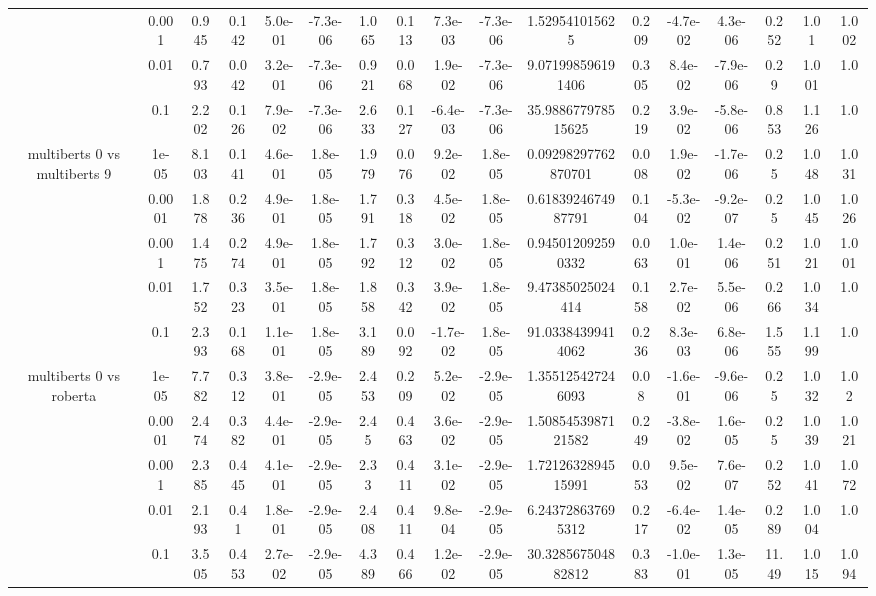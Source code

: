 \begin{tabular}{|c|c|c|c|c|c|c|c|c|c|c|c|c|c|c|c|c|}
 & 0.001 & 0.945 & 0.142 & 5.0e-01 & -7.3e-06 & 1.065 & 0.113 & 7.3e-03 & -7.3e-06 & 1.529541015625 & 0.209 & -4.7e-02 & 4.3e-06 & 0.252 & 1.01 & 1.002 \\
 & 0.01 & 0.793 & 0.042 & 3.2e-01 & -7.3e-06 & 0.921 & 0.068 & 1.9e-02 & -7.3e-06 & 9.071998596191406 & 0.305 & 8.4e-02 & -7.9e-06 & 0.29 & 1.001 & 1.0 \\
 & 0.1 & 2.202 & 0.126 & 7.9e-02 & -7.3e-06 & 2.633 & 0.127 & -6.4e-03 & -7.3e-06 & 35.988677978515625 & 0.219 & 3.9e-02 & -5.8e-06 & 0.853 & 1.126 & 1.0 \\
\hline
\multirow{5}{*}{multiberts 0 vs multiberts 9} & 1e-05 & 8.103 & 0.141 & 4.6e-01 & 1.8e-05 & 1.979 & 0.076 & 9.2e-02 & 1.8e-05 & 0.09298297762870701 & 0.008 & 1.9e-02 & -1.7e-06 & 0.25 & 1.048 & 1.031 \\
 & 0.0001 & 1.878 & 0.236 & 4.9e-01 & 1.8e-05 & 1.791 & 0.318 & 4.5e-02 & 1.8e-05 & 0.6183924674987791 & 0.104 & -5.3e-02 & -9.2e-07 & 0.25 & 1.045 & 1.026 \\
 & 0.001 & 1.475 & 0.274 & 4.9e-01 & 1.8e-05 & 1.792 & 0.312 & 3.0e-02 & 1.8e-05 & 0.945012092590332 & 0.063 & 1.0e-01 & 1.4e-06 & 0.251 & 1.021 & 1.001 \\
 & 0.01 & 1.752 & 0.323 & 3.5e-01 & 1.8e-05 & 1.858 & 0.342 & 3.9e-02 & 1.8e-05 & 9.47385025024414 & 0.158 & 2.7e-02 & 5.5e-06 & 0.266 & 1.034 & 1.0 \\
 & 0.1 & 2.393 & 0.168 & 1.1e-01 & 1.8e-05 & 3.189 & 0.092 & -1.7e-02 & 1.8e-05 & 91.03384399414062 & 0.236 & 8.3e-03 & 6.8e-06 & 1.555 & 1.199 & 1.0 \\
\hline
\multirow{5}{*}{multiberts 0 vs roberta } & 1e-05 & 7.782 & 0.312 & 3.8e-01 & -2.9e-05 & 2.453 & 0.209 & 5.2e-02 & -2.9e-05 & 1.355125427246093 & 0.08 & -1.6e-01 & -9.6e-06 & 0.25 & 1.032 & 1.02 \\
 & 0.0001 & 2.474 & 0.382 & 4.4e-01 & -2.9e-05 & 2.45 & 0.463 & 3.6e-02 & -2.9e-05 & 1.5085453987121582 & 0.249 & -3.8e-02 & 1.6e-05 & 0.25 & 1.039 & 1.021 \\
 & 0.001 & 2.385 & 0.445 & 4.1e-01 & -2.9e-05 & 2.33 & 0.411 & 3.1e-02 & -2.9e-05 & 1.7212632894515991 & 0.053 & 9.5e-02 & 7.6e-07 & 0.252 & 1.041 & 1.072 \\
 & 0.01 & 2.193 & 0.41 & 1.8e-01 & -2.9e-05 & 2.408 & 0.411 & 9.8e-04 & -2.9e-05 & 6.243728637695312 & 0.217 & -6.4e-02 & 1.4e-05 & 0.289 & 1.004 & 1.0 \\
 & 0.1 & 3.505 & 0.453 & 2.7e-02 & -2.9e-05 & 4.389 & 0.466 & 1.2e-02 & -2.9e-05 & 30.328567504882812 & 0.383 & -1.0e-01 & 1.3e-05 & 11.49 & 1.015 & 1.094 \\

\end{tabular}
